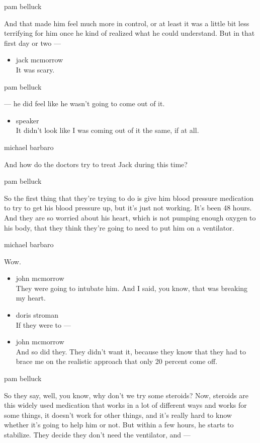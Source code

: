 pam belluck

And that made him feel much more in control, or at least it was a little
bit less terrifying for him once he kind of realized what he could
understand. But in that first day or two ---

\begin{itemize}
\tightlist
\item
  jack mcmorrow\\
  It was scary.
\end{itemize}

pam belluck

--- he did feel like he wasn't going to come out of it.

\begin{itemize}
\tightlist
\item
  speaker\\
  It didn't look like I was coming out of it the same, if at all.
\end{itemize}

michael barbaro

And how do the doctors try to treat Jack during this time?

pam belluck

So the first thing that they're trying to do is give him blood pressure
medication to try to get his blood pressure up, but it's just not
working. It's been 48 hours. And they are so worried about his heart,
which is not pumping enough oxygen to his body, that they think they're
going to need to put him on a ventilator.

michael barbaro

Wow.

\begin{itemize}
\item
  john mcmorrow\\
  They were going to intubate him. And I said, you know, that was
  breaking my heart.
\item
  doris stroman\\
  If they were to ---
\item
  john mcmorrow\\
  And so did they. They didn't want it, because they know that they had
  to brace me on the realistic approach that only 20 percent come off.
\end{itemize}

pam belluck

So they say, well, you know, why don't we try some steroids? Now,
steroids are this widely used medication that works in a lot of
different ways and works for some things, it doesn't work for other
things, and it's really hard to know whether it's going to help him or
not. But within a few hours, he starts to stabilize. They decide they
don't need the ventilator, and ---

